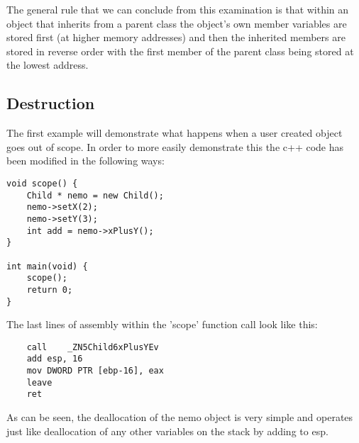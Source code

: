 \documentclass{article}
\begin{document}
The general rule that we can conclude from this examination is that within an object that inherits from a parent class the object's own member variables are stored first (at higher memory addresses) and then the inherited members are stored in reverse order with the first member of the parent class being stored at the lowest address.

\subsection{Destruction}
The first example will demonstrate what happens when a user created object goes out of scope. In order to more easily demonstrate this the c++ code has been modified in the following ways:

\begin{lstlisting}
void scope() {
    Child * nemo = new Child();
    nemo->setX(2);
    nemo->setY(3);
    int add = nemo->xPlusY();
}

int main(void) {
    scope();
    return 0;
}
\end{lstlisting}
The last lines of assembly within the 'scope' function call look like this:
\begin{lstlisting}
	call	_ZN5Child6xPlusYEv
	add	esp, 16
	mov	DWORD PTR [ebp-16], eax
	leave
	ret
\end{lstlisting} 
As can be seen, the deallocation of the nemo object is very simple and operates just like deallocation of any other variables on the stack by adding to esp.
\end{document}
